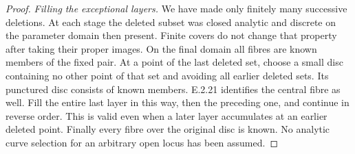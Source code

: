 \begin{proof}
\emph{Filling the exceptional layers.}
We have made only finitely many
successive deletions.  At each stage
the deleted subset was closed
analytic and discrete on the
parameter domain then present.
Finite covers do not change that
property after taking their proper
images.  On the final domain all
fibres are known members of the
fixed pair.  At a point of the
last deleted set, choose a small
disc containing no other point of
that set and avoiding all earlier
deleted sets.  Its punctured disc
consists of known members.  E.2.21
identifies the central fibre as
well.  Fill the entire last layer
in this way, then the preceding
one, and continue in reverse order.
This is valid even when a later
layer accumulates at an earlier
deleted point.  Finally every
fibre over the original disc is
known.  No analytic curve selection
for an arbitrary open locus has
been assumed.
\end{proof}

